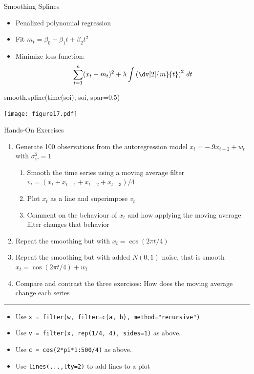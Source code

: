 \documentclass[ignorenonframetext,xcolor=x11names]{beamer}
\begin{document}
\begin{frame}[fragile]{Smoothing Splines}
\begin{itemize}
  \item Penalized polynomial regression
  \item Fit $m_t = \beta_0 + \beta_1 t + \beta_2 t^2$
  \item Minimize loss function:
\begin{align*}
\sum_{t=1}^n (x_t - m_t)^2 + \lambda \int \left( \dv[2]{m}{t} \right)^2 \, dt
\end{align*}
\end{itemize}
\begin{Rcode}
smooth.spline(time(soi), soi, spar=0.5)
\end{Rcode}
\vspace{-1.5\baselineskip}
\begin{center}
\texttt{[image: figure17.pdf]}
\end{center}
\end{frame}


\begin{frame}{Hands-On Exercises}
\begin{enumerate}
   \item Generate 100 observations from the autoregression model $x_t = -.9x_{t-2} + w_t$ with $\sigma^2_w = 1$
  \begin{enumerate}
     \item Smooth the time series using a moving average filter $v_t = (x_t + x_{t-1} + x_{t-2} + x_{t-3})/4$
     \item Plot $x_t$ as a line and superimpose $v_t$
     \item Comment on the behaviour of $x_t$ and how applying the moving average filter changes that behavior
  \end{enumerate}
  \item Repeat the smoothing but with $x_t = \cos(2 \pi t / 4)$
  \item Repeat the smoothing but with added $N(0,1)$ noise, that is smooth $x_t = \cos(2\pi t /4) + w_t$
  \item Compare and contrast the three exercises: How does the moving average change each series
\end{enumerate}
\hrule
\footnotesize
\begin{itemize}
  \item Use \texttt{x = filter(w, filter=c(a, b), method="recursive")}
  \item Use \texttt{v = filter(x, rep(1/4, 4), sides=1)} as above.
  \item Use \texttt{c = cos(2*pi*1:500/4)} as above.
  \item Use \texttt{lines(...,lty=2)} to add lines to a plot
\end{itemize}
\end{frame}
\end{document}
